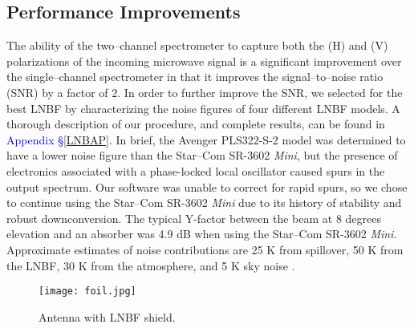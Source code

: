 \documentclass[11pt]{article}
\begin{document}
\subsection{Performance Improvements}
The ability of the two--channel spectrometer to capture both the (H) and (V) polarizations of the incoming microwave signal is a significant improvement over the single--channel spectrometer in that it improves the signal--to--noise ratio (SNR) by a factor of $2$. In order to further improve the SNR, we selected for the best LNBF by characterizing the noise figures of four different LNBF models. A thorough description of our procedure, and complete results, can be found in \textcolor{blue}{Appendix \S\ref{LNBAP}}. In brief, the Avenger PLS322-S-2 model was determined to have a lower noise figure than the Star--Com SR-3602 \textit{Mini}, but the presence of electronics associated with a phase-locked local oscillator caused spurs in the output spectrum. Our software was unable to correct for rapid spurs, so we chose to continue using the Star--Com SR-3602 \textit{Mini} due to its history of stability and robust downconversion. The typical Y-factor between the beam at 8 degrees elevation and an absorber was 4.9 dB when using the Star--Com SR-3602 \textit{Mini}. Approximate estimates of noise contributions are 25 K from spillover, 50 K from the LNBF, 30 K from the atmosphere, and 5 K sky noise \cite{VSRT77}.
	\begin{figure}[t]
		\centering
		\texttt{[image: foil.jpg]}
		\caption{Antenna with LNBF shield.}
		\label{foil}
	\end{figure}		
	
\end{document}
